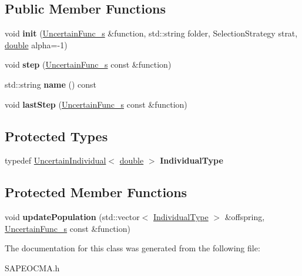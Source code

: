\subsection*{Public Member Functions}
\begin{DoxyCompactItemize}
\item 
void {\bfseries init} (\hyperlink{classUncertainFunc__s}{Uncertain\+Func\+\_\+s} \&function, std\+::string folder, Selection\+Strategy strat, \hyperlink{classdouble}{double} alpha=-\/1)\hypertarget{classSAPEOcma_a6321c7e276d70b22514a3df3c0b9d775}{}\label{classSAPEOcma_a6321c7e276d70b22514a3df3c0b9d775}

\item 
void {\bfseries step} (\hyperlink{classUncertainFunc__s}{Uncertain\+Func\+\_\+s} const \&function)\hypertarget{classSAPEOcma_a3979bc0207dd2deb4757ff0b51ec2739}{}\label{classSAPEOcma_a3979bc0207dd2deb4757ff0b51ec2739}

\item 
std\+::string {\bfseries name} () const \hypertarget{classSAPEOcma_abc2ef6d422cb72cc1f693a526f231b90}{}\label{classSAPEOcma_abc2ef6d422cb72cc1f693a526f231b90}

\item 
void {\bfseries last\+Step} (\hyperlink{classUncertainFunc__s}{Uncertain\+Func\+\_\+s} const \&function)\hypertarget{classSAPEOcma_a544b2171746d88fb5a667c1e74fe4423}{}\label{classSAPEOcma_a544b2171746d88fb5a667c1e74fe4423}

\end{DoxyCompactItemize}
\subsection*{Protected Types}
\begin{DoxyCompactItemize}
\item 
typedef \hyperlink{classUncertainIndividual}{Uncertain\+Individual}$<$ \hyperlink{classdouble}{double} $>$ {\bfseries Individual\+Type}\hypertarget{classSAPEOcma_a3f9c807ecf984ef377045eb7ffa2a699}{}\label{classSAPEOcma_a3f9c807ecf984ef377045eb7ffa2a699}

\end{DoxyCompactItemize}
\subsection*{Protected Member Functions}
\begin{DoxyCompactItemize}
\item 
void {\bfseries update\+Population} (std\+::vector$<$ \hyperlink{classUncertainIndividual}{Individual\+Type} $>$ \&offspring, \hyperlink{classUncertainFunc__s}{Uncertain\+Func\+\_\+s} const \&function)\hypertarget{classSAPEOcma_ac0b42cf4f87a660c75354deafbce4462}{}\label{classSAPEOcma_ac0b42cf4f87a660c75354deafbce4462}

\end{DoxyCompactItemize}


The documentation for this class was generated from the following file\+:\begin{DoxyCompactItemize}
\item 
S\+A\+P\+E\+O\+C\+M\+A.\+h\end{DoxyCompactItemize}
